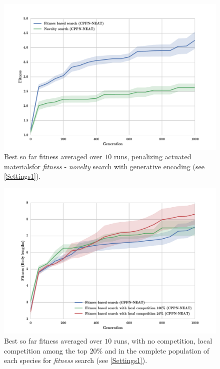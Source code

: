 \begin{figure}
\centering
\includegraphics[width=1.0\textwidth]{../Figures/Results/FitNovSize5Pen2.pdf}
\caption[]{Best so far fitness averaged over $10$ runs, penalizing actuated materials\footnotemark for \emph{fitness} - \emph{novelty} search with generative encoding (see \ref{Settings1}).}
\label{fig:FitNovRandomSize5}
\end{figure}


\begin{figure}[h!]
\centering
\includegraphics[width=1.0\textwidth]{../Figures/Results/fitComp100_20percent.pdf}
\caption{Best so far fitness averaged over $10$ runs, with no competition, local competition among the top $20\%$ and in the complete population of each species for \emph{fitness} search (see \ref{Settings1}).}
\label{fig:fitComp100_20percent}
\end{figure}


